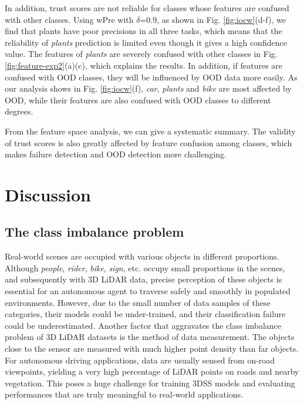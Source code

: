 \documentclass[journal]{IEEEtran}
\begin{document}
In addition, trust scores are not reliable for classes whose features are confused with other classes. Using wPre with $\delta$=0.9, as shown in Fig. \ref{fig:iocw}(d-f), we find that plants have poor precisions in all three tasks, which means that the reliability of \textit{plants} prediction is limited even though it gives a high confidence value. The features of \textit{plants} are severely confused with other classes in Fig. \ref{fig:feature-exp2}(a)(c), which explains the results. In addition, if features are confused with OOD classes, they will be influenced by OOD data more easily. As our analysis shows  in Fig. \ref{fig:iocw}(f), \textit{car}, \textit{plants} and \textit{bike} are most affected by OOD, while their features are also confused with OOD classes to different degrees.

From the feature space analysis, we can give a systematic summary. The validity of trust scores is also greatly affected by feature confusion among classes, which makes failure detection and OOD detection more challenging.


\section{Discussion} \label{sec:6}

\subsection{The class imbalance problem}

Real-world scenes are occupied with various objects in different proportions. Although \textit{people}, \textit{rider}, \textit{bike}, \textit{sign}, etc. occupy small proportions in the scenes, and subsequently with 3D LiDAR data, precise perception of these objects is essential for an autonomous agent to traverse safely and smoothly in populated environments. However, due to the small number of data samples of these categories, their models could be under-trained, and their classification failure could be underestimated. Another factor that aggravates the class imbalance problem of 3D LiDAR datasets is the method of data measurement. The objects close to the sensor are measured with much higher point density than far objects. For autonomous driving applications, data are usually sensed from on-road viewpoints, yielding a very high percentage of LiDAR points on roads and nearby vegetation. This poses a huge challenge for training 3DSS models and evaluating performances that are truly meaningful to real-world applications. 
\end{document}
